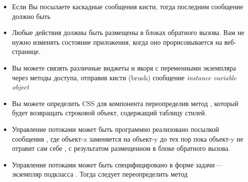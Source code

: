 \documentclass[a4paper,10pt,twoside]{book}
\begin{document}
\begin{itemize}
\item Если Вы посылаете каскадные сообщения кисти, тогда последним
сообщение должно быть 
\item Любые действия должны быть размещены в блоках обратного вызова.
Вам не нужно изменять состояние приложения, когда оно прорисовывается на
веб-странице.
\item Вы можете связять различные виджеты и якоря с переменными
экземпляра через методы доступа, отправив кисти (brush) сообщение 
\emph{instance variable}  \emph{object}
\item Вы можете определить CSS для компонента переопределив метод
, который будет возвращать строковой объект, содержащий таблицу
стилей.
\item Управление потоками может быть программно реализовано посылкой
сообщения , где объект-x заменяется на объект-y до тех пор
пока объект-y не отравит сам себе , с результатом
размещенном в блоке обратного вызова.
\item Управление потоками может быть специфицировано
в форме задачи\,---\,
экземпляр подкласса . Тогда следует переопределить метод

\end{itemize}
\end{document}
